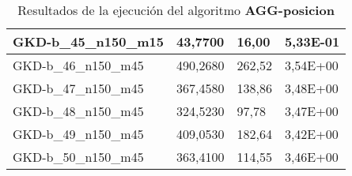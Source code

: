 \begin{table}[!ht]
\begin{adjustbox}{height=12cm}
\begin{tabular}{|l|l|l|l|}
		GKD-b\_45\_n150\_m15 & 43,7700  & 16,00         & 5,33E-01 \\ \hline
		GKD-b\_46\_n150\_m45 & 490,2680 & 262,52        & 3,54E+00 \\ \hline
		GKD-b\_47\_n150\_m45 & 367,4580 & 138,86        & 3,48E+00 \\ \hline
		GKD-b\_48\_n150\_m45 & 324,5230 & 97,78         & 3,47E+00 \\ \hline
		GKD-b\_49\_n150\_m45 & 409,0530 & 182,64        & 3,42E+00 \\ \hline
		GKD-b\_50\_n150\_m45 & 363,4100 & 114,55        & 3,46E+00 \\ \hline
    \end{tabular}
    \end{adjustbox}
    \caption{Resultados de la ejecución del algoritmo \textbf{AGG-posicion}}
\end{table}

\pagebreak